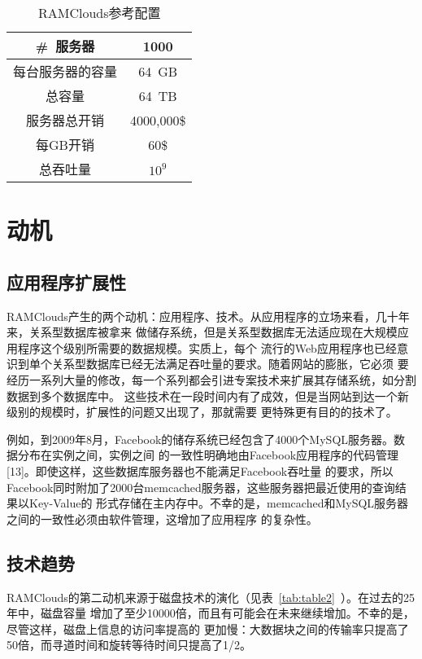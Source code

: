 \documentclass[translation]{zjutreport}
\begin{document}
\begin{table}[htbp]
\caption{RAMClouds参考配置}\label{tab:table1}
\vspace{0.5em}
\begin{center}
{\wuhao
\begin{tabular}{cc}
\toprule[1.5pt]
\#~服务器 & 1000\\
\midrule[1pt]
每台服务器的容量 & 64~GB \\
总容量 & 64~TB \\
服务器总开销 & 4000,000\$ \\
每GB开销 & 60\$ \\
总吞吐量 & $10^{9}$ \\
\bottomrule[1.5pt]
\end{tabular}}
\end{center}
\vspace{\baselineskip}
\end{table}

\chapter{动机}
\section{应用程序扩展性}
RAMClouds产生的两个动机：应用程序、技术。从应用程序的立场来看，几十年来，关系型数据库被拿来
做储存系统，但是关系型数据库无法适应现在大规模应用程序这个级别所需要的数据规模。实质上，每个
流行的Web应用程序也已经意识到单个关系型数据库已经无法满足吞吐量的要求。随着网站的膨胀，它必须
要经历一系列大量的修改，每一个系列都会引进专案技术来扩展其存储系统，如分割数据到多个数据库中。
这些技术在一段时间内有了成效，但是当网站到达一个新级别的规模时，扩展性的问题又出现了，那就需要
更特殊更有目的的技术了。

例如，到2009年8月，Facebook的储存系统已经包含了4000个MySQL服务器。数据分布在实例之间，实例之间
的一致性明确地由Facebook应用程序的代码管理[13]。即使这样，这些数据库服务器也不能满足Facebook吞吐量
的要求，所以Facebook同时附加了2000台memcached服务器，这些服务器把最近使用的查询结果以Key-Value的
形式存储在主内存中。不幸的是，memcached和MySQL服务器之间的一致性必须由软件管理，这增加了应用程序
的复杂性。

\section{技术趋势}
RAMClouds的第二动机来源于磁盘技术的演化（见表~\ref{tab:table2}~）。在过去的25年中，磁盘容量
增加了至少10000倍，而且有可能会在未来继续增加。不幸的是，尽管这样，磁盘上信息的访问率提高的
更加慢：大数据块之间的传输率只提高了50倍，而寻道时间和旋转等待时间只提高了1/2。
\end{document}

